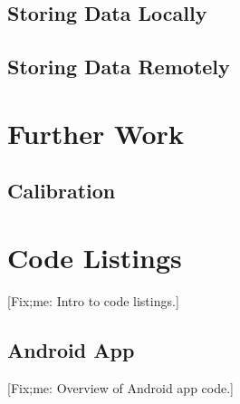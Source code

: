 \documentclass[11pt, a4paper, oneside, english]{scrbook}
\begin{document}
\section{Storing Data Locally} %
\label{sec:test_2_storing_data_locally}

\section{Storing Data Remotely} %
\label{sec:test_3_storing_data_remotely}

\chapter{Further Work} %
\label{cha:further_work}
\section{Calibration} %
\label{sec:calibration}

\chapter{Code Listings} %
\label{cha:code_listings}
[Fix;me: Intro to code listings.]
\section{Android App} %
\label{sec:android_app}
[Fix;me: Overview of Android app code.]

\newpage

\newpage

\newpage



\end{document}

